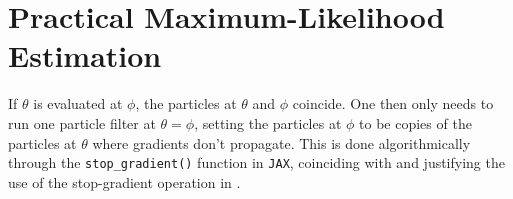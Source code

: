 \documentclass[numsec,webpdf,modern,medium,namedate]{oup-authoring-template}
\newcommand\arxiv[2]{#2} %
\theoremstyle{thmstyleone}%
\theoremstyle{thmstyletwo}%
\theoremstyle{thmstylethree}%
\begin{document}



\arxiv{}{\vspace*{-3mm}}
\section{Practical Maximum-Likelihood Estimation}
\arxiv{}{\vspace*{-1mm}}

If $\theta$ is evaluated at $\phi$, the particles at $\theta$ and $\phi$ coincide. One then only needs to run one particle filter at $\theta=\phi$, setting the particles at $\phi$ to be copies of the particles at $\theta$ where gradients don't propagate. This is done algorithmically through the \texttt{stop\_gradient()} function in \texttt{JAX}, coinciding with and justifying the use of the stop-gradient operation in \cite{scibior21}.

\arxiv{}{\vspace*{-2mm}}
\end{document}
